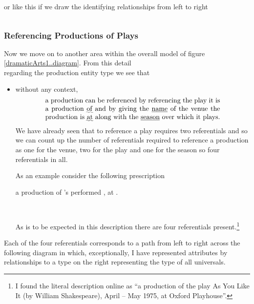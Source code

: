 \begin{equation*}

\end{equation*}
or like this if we draw the identifying relationships from left to right

\begin{equation*}

\end{equation*}

\subsubsection{Referencing Productions of Plays}
Now we move on to another area within the overall model of figure \ref{dramaticArts1..diagram}. From this detail 
\begin{equation*}

\end{equation*}
regarding the production entity type  we see that
\begin{itemize}
  \item
  without any context, 
  \begin{equation} 
\label{absoluteCharacterReferencing}
\text{\parbox{9cm}{a production can be referenced by referencing the play it is a production \uwave{of} 
  and by giving the \underline{name} of the venue  the production is \uwave{at} along with the \underline{season} 
  over which it plays.}}
\end{equation}
We have already seen that to reference a play requires two referentials and so
we can count up the number of referentials required to reference a production
  as one for the venue, two for the play and one for the season so four referentials in all. 



As an example consider the following prescription
\begin{erquote}
\parbox{9cm}{a production of \mbox{'s} 
 performed \mbox{,} at .}\\
\end{erquote}
As is to be expected in this description there are four referentials present.\footnote{
I found the literal description online as ``a production of the play As You Like It (by William Shakespeare), April – May 1975, at Oxford Playhouse''.  
} 
\end{itemize}
Each of the four referentials corresponds to a path from left to right across the following diagram in which, exceptionally, I have represented attributes by relationships to a type on the right representing the type of all universals.

